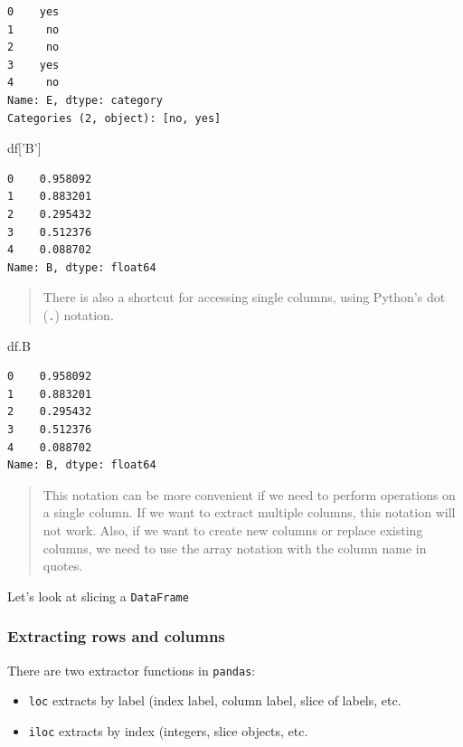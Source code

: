 \documentclass[
  letterpaper,
]{scrbook}
\newenvironment{Shaded}{\begin{snugshade}}{\end{snugshade}}
\newcommand{\NormalTok}[1]{#1}
\newcommand{\StringTok}[1]{\textcolor[rgb]{0.31,0.60,0.02}{#1}}
\providecommand{\tightlist}{%
  \setlength{\itemsep}{0pt}\setlength{\parskip}{0pt}}
\begin{document}
\begin{verbatim}
0    yes
1     no
2     no
3    yes
4     no
Name: E, dtype: category
Categories (2, object): [no, yes]
\end{verbatim}

\begin{Shaded}
\begin{Highlighting}[]
\NormalTok{df[}\StringTok{'B'}\NormalTok{]}
\end{Highlighting}
\end{Shaded}

\begin{verbatim}
0    0.958092
1    0.883201
2    0.295432
3    0.512376
4    0.088702
Name: B, dtype: float64
\end{verbatim}

\begin{quote}
There is also a shortcut for accessing single columns, using Python's dot (\texttt{.}) notation.
\end{quote}

\begin{Shaded}
\begin{Highlighting}[]
\NormalTok{df.B}
\end{Highlighting}
\end{Shaded}

\begin{verbatim}
0    0.958092
1    0.883201
2    0.295432
3    0.512376
4    0.088702
Name: B, dtype: float64
\end{verbatim}

\begin{quote}
This notation can be more convenient if we need to perform operations on a single column. If we want to extract multiple columns, this notation will not work. Also, if we want to create new columns or replace existing columns, we need to use the array notation with the column name in quotes.
\end{quote}

Let's look at slicing a \texttt{DataFrame}

\hypertarget{extracting-rows-and-columns}{%
\subsubsection{Extracting rows and columns}\label{extracting-rows-and-columns}}

There are two extractor functions in \texttt{pandas}:

\begin{itemize}
\tightlist
\item
  \texttt{loc} extracts by label (index label, column label, slice of labels, etc.
\item
  \texttt{iloc} extracts by index (integers, slice objects, etc.
\end{itemize}
\end{document}
